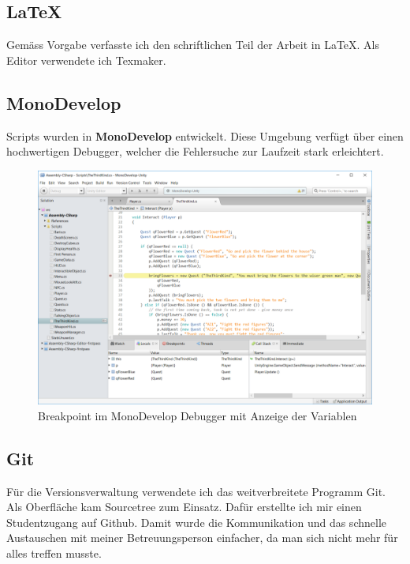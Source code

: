 \subsection{LaTeX}

Gemäss Vorgabe verfasste ich den schriftlichen Teil der Arbeit in LaTeX.
Als Editor verwendete ich Texmaker.

\subsection{MonoDevelop}

Scripts wurden in \textbf{MonoDevelop} entwickelt.
Diese Umgebung verfügt über einen hochwertigen Debugger, welcher die Fehlersuche zur Laufzeit stark erleichtert.

\begin{figure}[H]
\includegraphics[scale=0.5]{screenshots/monodevelop.png}
\caption{Breakpoint im MonoDevelop Debugger mit Anzeige der Variablen}
\end{figure}

\subsection{Git}

Für die Versionsverwaltung verwendete ich das weitverbreitete Programm Git.
Als Oberfläche kam Sourcetree zum Einsatz.
Dafür erstellte ich mir einen Studentzugang auf Github.
Damit wurde die Kommunikation und das schnelle Austauschen mit meiner Betreuungsperson einfacher, da man sich nicht mehr für alles treffen musste.

